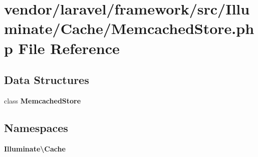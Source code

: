\section{vendor/laravel/framework/src/\+Illuminate/\+Cache/\+Memcached\+Store.php File Reference}
\label{_memcached_store_8php}
\subsection*{Data Structures}
\begin{DoxyCompactItemize}
\item 
class {\bf Memcached\+Store}
\end{DoxyCompactItemize}
\subsection*{Namespaces}
\begin{DoxyCompactItemize}
\item 
 {\bf Illuminate\textbackslash{}\+Cache}
\end{DoxyCompactItemize}
